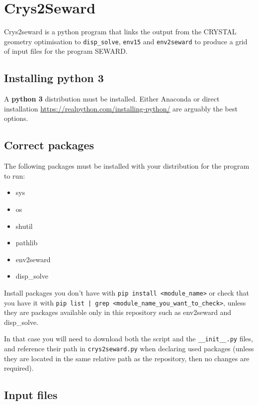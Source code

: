 \section{Crys2Seward}

Crys2seward is a python program that links the output from the CRYSTAL geometry optimisation to \texttt{disp\_solve}, \texttt{env15} and \texttt{env2seward} to produce a grid of input files for the program SEWARD.

\subsection{Installing python 3}

A \textbf{python 3} distribution must be installed. Either Anaconda or direct installation \url{https://realpython.com/installing-python/} are arguably the best options. 

\subsection{Correct packages}

The following packages must be installed with your distribution for the program to run:

\begin{itemize}
	\item sys
	\item os
	\item shutil
	\item pathlib
	\item env2seward
	\item disp\_solve
\end{itemize}

Install packages you don't have with \texttt{pip install <module\_name>} or check that you have it with \texttt{pip list | grep <module\_name\_you\_want\_to\_check>}, unless they are packages available only in this repository such as env2seward and disp\_solve.

In that case you will need to download both the script and the \texttt{\_\_init\_\_.py} files, and reference their path in \texttt{crys2seward.py} when declaring used packages (unless they are located in the same relative path as the repository, then no changes are required).

\subsection{Input files}

